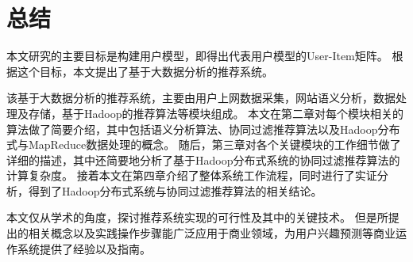 \chapter{总结}
本文研究的主要目标是构建用户模型，即得出代表用户模型的User-Item矩阵。
根据这个目标，本文提出了基于大数据分析的推荐系统。

该基于大数据分析的推荐系统，主要由用户上网数据采集，网站语义分析，数据处理及存储，基于Hadoop的推荐算法等模块组成。
本文在第二章对每个模块相关的算法做了简要介绍，其中包括语义分析算法、协同过滤推荐算法以及Hadoop分布式与MapReduce数据处理的概念。
随后，第三章对各个关键模块的工作细节做了详细的描述，其中还简要地分析了基于Hadoop分布式系统的协同过滤推荐算法的计算复杂度。
接着本文在第四章介绍了整体系统工作流程，同时进行了实证分析，得到了Hadoop分布式系统与协同过滤推荐算法的相关结论。

本文仅从学术的角度，探讨推荐系统实现的可行性及其中的关键技术。
但是所提出的相关概念以及实践操作步骤能广泛应用于商业领域，为用户兴趣预测等商业运作系统提供了经验以及指南。